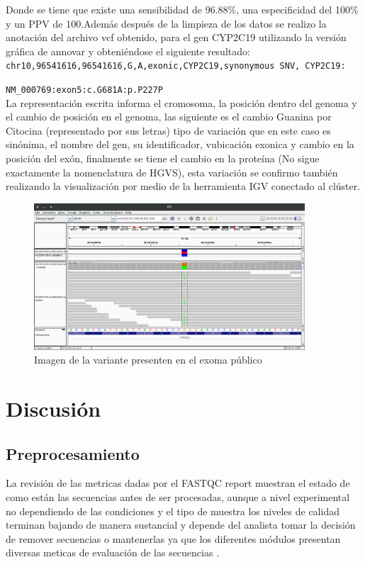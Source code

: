Donde se tiene que existe una sensibilidad de 96.88\%, una especificidad del 100\% y un PPV de 100.Además después de la limpieza de los datos se realizo la anotación del archivo vcf obtenido, para el gen CYP2C19 utilizando la versión gráfica de annovar \cite{Yang2015} y obteniéndose el siguiente resultado: \\

\texttt{chr10,96541616,96541616,G,A,exonic,CYP2C19,synonymous SNV, CYP2C19:}

\texttt{NM\_000769:exon5:c.G681A:p.P227P} \\

La representación escrita informa el cromosoma, la posición dentro del genoma y el cambio de posición en el genoma, las siguiente es el cambio Guanina por Citocina (representado por sus letras) tipo de variación que en este caso es sinónima, el nombre del gen, su identificador, vubicación exonica y cambio en la posición del exón, finalmente se tiene el cambio en la proteína (No sigue exactamente la nomenclatura de HGVS), esta variación se confirmo también realizando la visualización por medio de la herramienta IGV conectado al clúster.

\begin{figure}[H]
	\centering
	\includegraphics[width=0.9\textwidth]{Kap2/IGV}
	\caption{Imagen de la variante presenten en el exoma público} \label{fig:igv}
\end{figure}

\section{Discusión}

\subsection*{Preprocesamiento}

La revisión de las metricas dadas por el FASTQC report muestran el estado de como están las secuencias antes de ser procesadas, aunque a nivel experimental no dependiendo de las condiciones y el tipo de muestra los niveles de calidad terminan bajando de manera sustancial y depende del analista tomar la decisión de remover secuencias o mantenerlas ya que los diferentes módulos presentan diversas meticas de evaluación de las secuencias \cite{Babraham2016}. \\

